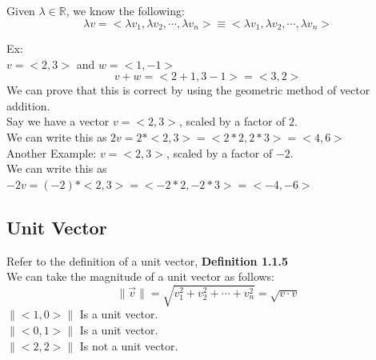 \documentclass[]{article}
\begin{document}
    Given $\lambda \in \mathbb{R}$, we know the following:
    \begin{equation}
        \lambda v = <\lambda v_1, \lambda v_2, \cdots, \lambda v_n> \equiv <\lambda v_1, \lambda v_2, \cdots, \lambda v_n>
    \end{equation}

    Ex:\\
    \quad $v = <2, 3>$ and $w = <1, -1>$
    \begin{equation*}
        v + w = <2 + 1, 3 - 1> = <3, 2>
    \end{equation*}
    We can prove that this is correct by using the geometric method of vector addition.\\

    Say we have a vector $v = <2, 3>$, scaled by a factor of $2$. \\We can write this as $2v = 2*<2, 3> = <2 * 2, 2 * 3> = <4, 6>$\\
    
    Another Example: $v = <2, 3>$, scaled by a factor of $-2$. \\We can write this as $-2v = (-2)*<2, 3> = <-2 * 2, -2 * 3> = <-4, -6>$\\ 

    \subsection*{Unit Vector}
    Refer to the definition of a unit vector, \textbf{Definition 1.1.5}\\
    We can take the magnitude of a unit vector as follows:\\
    \begin{equation}
        \lVert \overrightarrow{v} \rVert = \sqrt{v_1^2 + v_2^2 + \cdots + v_n^2} = \sqrt{v \cdot v}
    \end{equation}
    $\lVert <1,0> \rVert$ Is a unit vector.\\
    $\lVert <0,1> \rVert$ Is a unit vector.\\
    $\lVert <2, 2> \rVert$ Is not a unit vector.\\
\end{document}
